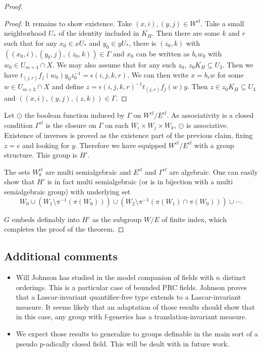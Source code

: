 \documentclass[12pt]{article}
\theoremstyle{definition}
\theoremstyle{mystyle}
\theoremstyle{remark}
\newenvironment{claimproof}
    {\begin{proof}}{\renewcommand\qedsymbol{\Squarepipe} \end{proof}}
\begin{document}
\begin{proof}
\begin{claimproof}
It remains to show existence. Take $(x,i),(y,j)\in W^{cl}$. Take a
small neighborhood $U_*$ of the identity included in
$\overline{K_H}$. Then there are some $k$  and $r$ such that for any
$x_0\in xU_*$ and $y_0\in yU_*$, there is $(z_0,k)$ with
$((x_0,i),(y_0,j),(z_0,k))\in \Gamma$ and $x_0$ can be written as
$b_r w_0$ with $w_0\in U_{m+4}\cap X$. We may also assume that for
any such $z_0$, $z_0\overline{K_H} \subseteq U_3$. Then we have
$t_{(j,r)} f_j(w_0)y_0z_0^{-1}=\epsilon(i,j,k,r)$. We can then
write $x=b_r w$ for some $w\in U_{m+3}\cap X$ and define
$z=\epsilon(i,j,k,r)^{-1}t_{(j,r)} f_j(w)y$. Then $z\in
z_0\overline{K_H} \subseteq U_3$ and $((x,i),(y,j),(z,k))\in
\Gamma$.
\end{claimproof}

Let $\odot$ the boolean function induced by $\Gamma$ on
$W^{cl}/E^{cl}$. As associativity is a closed condition
$\Gamma^{cl}$ is the closure on $\Gamma$ on each $W_i\times W_j
\times W_k$, $\odot$ is associative. Existence of inverses is
proved as the existence part of the previous claim, fixing $z=e$
and looking for $y$. Therefore we have equipped $W^{cl}/E^{cl}$
with a group structure. This group is $H'$.

The sets $W^{cl}_k$ are multi semialgebraic and $E^{cl}$ and
$\Gamma^{cl}$ are algebraic. One can easily show that $H'$ is in
fact multi semialgebraic (or is in bijection with a multi
semialgebraic group) with underlying set
\[W_0 \cup (W_1\setminus \pi^{-1}(\pi(W_0))) \cup (W_2 \setminus
\pi^{-1}(\pi(W_1)\cap \pi(W_0))) \cup \cdots.\]

$G$ embeds definably into $H'$ as the subgroup $W/E$ of finite
index, which completes the proof of the theorem.
\end{proof}

\subsection{Additional comments}

\begin{itemize}
\item Will Johnson has studied in \cite{joh_prc} the model companion of fields with $n$ distinct orderings. This is a particular case of bounded PRC fields. Johnson proves that a Lascar-invariant quantifier-free type extends to a Lascar-invariant measure. It seems likely that an adaptation of those results should show that in this case, any group with f-generics has a translation-invariant measure.
\item We expect those results to generalize to groups definable in the main sort of a pseudo p-adically closed field. This will be dealt with in future work.
\end{itemize}
\end{document}
